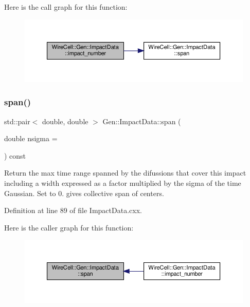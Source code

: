 Here is the call graph for this function\+:
\nopagebreak
\begin{figure}[H]
\begin{center}
\leavevmode
\includegraphics[width=350pt]{class_wire_cell_1_1_gen_1_1_impact_data_a00db275ffb82f82831016b7ebaaed6e3_cgraph}
\end{center}
\end{figure}
\mbox{\label{class_wire_cell_1_1_gen_1_1_impact_data_acccaa5e82f44245eaa0bfbd6f99eecce}} 
\subsubsection{\texorpdfstring{span()}{span()}}
{\footnotesize\ttfamily std\+::pair$<$ double, double $>$ Gen\+::\+Impact\+Data\+::span (\begin{DoxyParamCaption}\item[{double}]{nsigma = {} }\end{DoxyParamCaption}) const}

Return the max time range spanned by the difussions that cover this impact including a width expressed as a factor multiplied by the sigma of the time Gaussian. Set to 0. gives collective span of centers. 

Definition at line 89 of file Impact\+Data.\+cxx.

Here is the caller graph for this function\+:
\nopagebreak
\begin{figure}[H]
\begin{center}
\leavevmode
\includegraphics[width=350pt]{class_wire_cell_1_1_gen_1_1_impact_data_acccaa5e82f44245eaa0bfbd6f99eecce_icgraph}
\end{center}
\end{figure}
\mbox{\label{class_wire_cell_1_1_gen_1_1_impact_data_afb1c936f26afc1f968f727b3f72af2e4}} 
